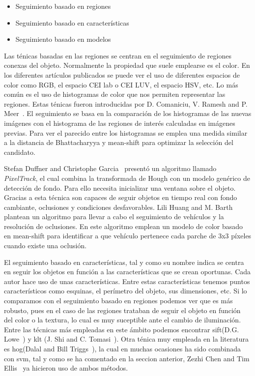\begin{itemize}
    \item Seguimiento basado en regiones
    \item Seguimiento basado en características
    \item Seguimiento basado en modelos
\end{itemize}

Las ténicas basadas en las regiones se centran en el seguimiento de regiones conexas del objeto. Normalmente la propiedad que suele emplearse es el color. En los diferentes artículos publicados se puede ver el uso de diferentes espacios de color como RGB, el espacio CEI lab o CEI LUV, el espacio HSV, etc. Lo más común es el uso de histogramas de color que nos permiten representar las regiones. Estas ténicas fueron introducidas por D. Comaniciu, V. Ramesh and P. Meer~\cite{kernel_based_object}. El seguimiento se basa en la comparación de los histogramas de las nuevas imágenes con el histograma de las regiones de interés calculadas en imágenes previas. Para ver el parecido entre los histogramas se emplea una medida similar a la distancia de Bhattacharyya y mean-shift para optimizar la selección del candidato.

Stefan Duffner and Christophe Garcia~\cite{pixeltrack} presentó un algoritmo llamado \textit{PixelTrack}, el cual combina la transformada de Hough con un modelo genérico de detección de fondo. Para ello necesita inicializar una ventana sobre el objeto. Gracias a esta técnica son capaces de seguir objetos en tiempo real con fondo cambiante, oclusiones y condiciones desfavorables.
Lili Huang and M. Barth~\cite{real_time_vehicle} plantean un algoritmo para llevar a cabo el seguimiento de vehículos y la resolución de oclusiones. En este algoritmo emplean un modelo de color basado en mean-shift para identificar a que vehículo pertenece cada parche de 3x3 píxeles cuando existe una oclusión.

El seguimiento basado en características, tal y como su nombre indica se centra en seguir los objetos en función a las características que se crean oportunas. Cada autor hace uso de unas características. Entre estas características tenemos puntos característicos como esquinas, el perímetro del objeto, sus dimensiones, etc. Si lo comparamos con el seguimiento basado en regiones podemos ver que es más robusto, pues en el caso de las regiones trataban de seguir el objeto en función del color o la textura, lo cual es muy suceptible ante el cambio de iluminación. Entre las técnicas más empleadas en este ámbito podemos encontrar \acrfull{sift}(D.G. Lowe~\cite{article_sift}) y \acrfull{klt} (J. Shi and C. Tomasi~\cite{article_klt}). Otra ténica muy empleada en la literatura es \acrshort{hog}(Dalal and Bill Triggs~\cite{hog_paper}), la cual en muchas ocasiones ha sido combinada con \acrshort{svm}, tal y como se ha comentado en la seccion anterior, Zezhi Chen and Tim Ellis~\cite{multi_shape_descriptor} ya hicieron uso de ambos métodos.


